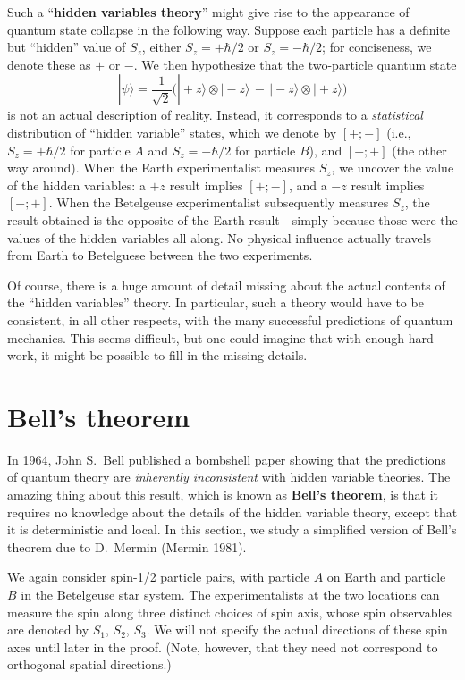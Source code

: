 \documentclass[pra,11pt]{revtex4}
\begin{document}
Such a ``\textbf{hidden variables theory}'' might give rise to the
appearance of quantum state collapse in the following way.  Suppose
each particle has a definite but ``hidden'' value of $S_z$, either
$S_z = +\hbar/2$ or $S_z = -\hbar/2$; for conciseness, we denote these
as $+$ or $-$.  We then hypothesize that the two-particle quantum state
$$|\psi\rangle = \frac{1}{\sqrt{2}} \Big(|\!+\!z\rangle\otimes|\!-\!z\rangle \,-\, |\!-\!z\rangle\otimes|\!+\!z\rangle\Big)$$
is not an actual description of reality.  Instead, it corresponds to a
\textit{statistical} distribution of ``hidden variable'' states, which
we denote by $[+;-]$ (i.e., $S_z = +\hbar/2$ for particle $A$ and $S_z
= -\hbar/2$ for particle $B$), and $[-;+]$ (the other way around).
When the Earth experimentalist measures $S_z$, we uncover the value of
the hidden variables: a $+z$ result implies $[+;-]$, and a $-z$ result
implies $[-;+]$.  When the Betelgeuse experimentalist subsequently
measures $S_z$, the result obtained is the opposite of the Earth
result---simply because those were the values of the hidden variables
all along.  No physical influence actually travels from Earth to
Betelguese between the two experiments.

Of course, there is a huge amount of detail missing about the actual
contents of the ``hidden variables'' theory.  In particular, such a
theory would have to be consistent, in all other respects, with the
many successful predictions of quantum mechanics.  This seems
difficult, but one could imagine that with enough hard work, it might
be possible to fill in the missing details.

\section{Bell's theorem}

In 1964, John S.~Bell published a bombshell paper showing that the
predictions of quantum theory are \textit{inherently inconsistent}
with hidden variable theories.  The amazing thing about this result,
which is known as \textbf{Bell's theorem}, is that it requires no
knowledge about the details of the hidden variable theory, except that
it is deterministic and local.  In this section, we study a simplified
version of Bell's theorem due to D.~Mermin (Mermin 1981).

We again consider spin-1/2 particle pairs, with particle $A$ on Earth
and particle $B$ in the Betelgeuse star system.  The experimentalists
at the two locations can measure the spin along three distinct choices
of spin axis, whose spin observables are denoted by $S_1$, $S_2$,
$S_3$.  We will not specify the actual directions of these spin axes
until later in the proof.  (Note, however, that they need not
correspond to orthogonal spatial directions.)
\end{document}
